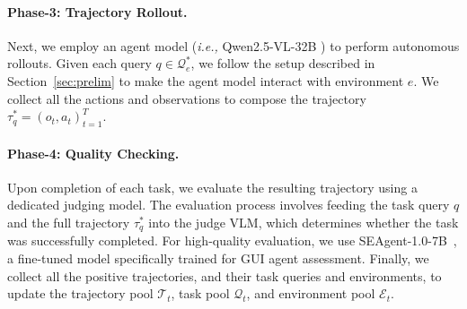 \documentclass{article} %
\newcommand{\ie}{\emph{i.e.,}\xspace}
\begin{document}
\paragraph{Phase-3: Trajectory Rollout.}
Next, we employ an agent model (\ie Qwen2.5-VL-32B \citep{yang2024qwen2.5}) to perform autonomous rollouts. 
Given each query $q \in {\mathcal{Q}}^{*}_e$, we follow the setup described in Section~\ref{sec:prelim} to make the agent model interact with environment $e$.
We collect all the actions and observations to compose the trajectory $\tau^{*}_{q}=(o_t,a_t)_{t=1}^T$.


\paragraph{Phase-4: Quality Checking.}
Upon completion of each task, we evaluate the resulting trajectory using a dedicated judging model. The evaluation process involves feeding the task query $q$ and the full trajectory $\tau^{*}_{q}$ into the judge VLM, which determines whether the task was successfully completed. 
For high-quality evaluation, we use SEAgent-1.0-7B~\citep{SEAgent}, a fine-tuned model specifically trained for GUI agent assessment.
Finally, we collect all the positive trajectories, and their task queries and environments, to update the trajectory pool $\mathcal{T}_t$, task pool $\mathcal{Q}_t$, and environment pool $\mathcal{E}_t$.

\end{document}
